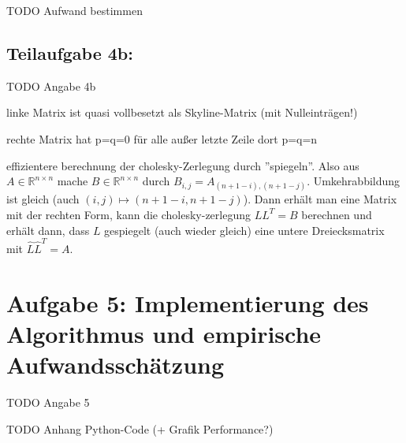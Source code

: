 \documentclass[]{article}
\begin{document}
TODO Aufwand bestimmen

\subsection*{Teilaufgabe 4b:}
TODO Angabe 4b

linke Matrix ist quasi vollbesetzt als Skyline-Matrix (mit Nulleinträgen!)

rechte Matrix hat p=q=0 für alle außer letzte Zeile dort p=q=n

effizientere berechnung der cholesky-Zerlegung durch ''spiegeln''. Also aus $A \in \mathbb{R}^{n\times n}$ mache $B \in \mathbb{R}^{n\times n}$ durch $B_{i,j} = A_{(n+1-i),(n+1-j)}$. Umkehrabbildung ist gleich (auch $(i, j) \mapsto (n+1-i, n+1-j)$). Dann erhält man eine Matrix mit der rechten Form, kann die cholesky-zerlegung $LL^T=B$ berechnen und erhält dann, dass $L$ gespiegelt (auch wieder gleich) eine untere Dreiecksmatrix mit $\hat{L}\hat{L}^T=A$.

\section*{Aufgabe 5: Implementierung des Algorithmus und empirische Aufwandsschätzung}
TODO Angabe 5

TODO Anhang Python-Code (+ Grafik Performance?)
\end{document}
